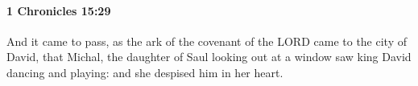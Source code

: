 
		\paragraph{1 Chronicles 15:29} %
			\label{1CHRONICLES-15-29}

			And it came to pass, as the ark of the covenant of the LORD came to the city of David, that Michal, the daughter of Saul looking out at a window saw king David dancing and playing: and she despised him in her heart.

